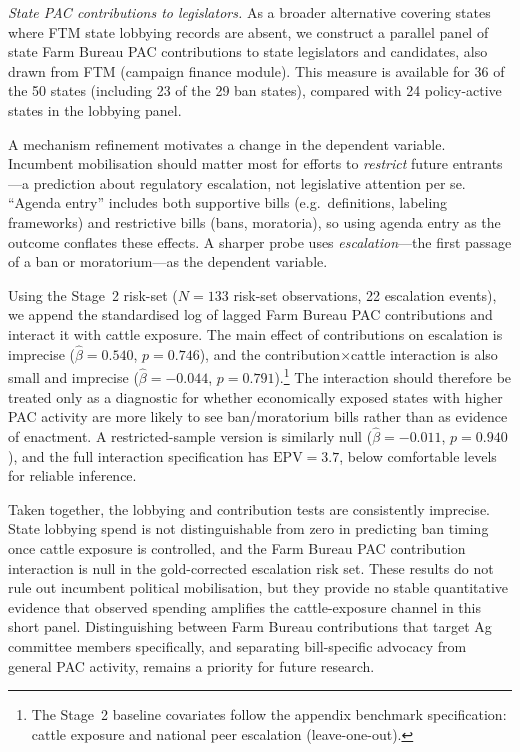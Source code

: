 \documentclass[12pt]{article}
\begin{document}
\textit{State PAC contributions to legislators.}  As a broader alternative covering states where FTM state lobbying records are absent, we construct a parallel panel of state Farm Bureau PAC contributions to state legislators and candidates, also drawn from FTM (campaign finance module).  This measure is available for 36 of the 50 states (including 23 of the 29 ban states), compared with 24 policy-active states in the lobbying panel.

A mechanism refinement motivates a change in the dependent variable.  Incumbent mobilisation should matter most for efforts to \emph{restrict} future entrants---a prediction about regulatory escalation, not legislative attention per se.  ``Agenda entry'' includes both supportive bills (e.g.\ definitions, labeling frameworks) and restrictive bills (bans, moratoria), so using agenda entry as the outcome conflates these effects.  A sharper probe uses \emph{escalation}---the first passage of a ban or moratorium---as the dependent variable.

Using the Stage~2 risk-set ($N = 133$ risk-set observations, 22 escalation events), we append the standardised log of lagged Farm Bureau PAC contributions and interact it with cattle exposure.  The main effect of contributions on escalation is imprecise ($\hat{\beta}=0.540$, $p=0.746$), and the contribution$\times$cattle interaction is also small and imprecise ($\hat{\beta}=-0.044$, $p=0.791$).\footnote{The Stage~2 baseline covariates follow the appendix benchmark specification: cattle exposure and national peer escalation (leave-one-out).}  The interaction should therefore be treated only as a diagnostic for whether economically exposed states with higher PAC activity are more likely to see ban/moratorium bills rather than as evidence of enactment.  A restricted-sample version is similarly null ($\hat{\beta}=-0.011$, $p=0.940$), and the full interaction specification has $\text{EPV}=3.7$, below comfortable levels for reliable inference.

Taken together, the lobbying and contribution tests are consistently imprecise.  State lobbying spend is not distinguishable from zero in predicting ban timing once cattle exposure is controlled, and the Farm Bureau PAC contribution interaction is null in the gold-corrected escalation risk set.  These results do not rule out incumbent political mobilisation, but they provide no stable quantitative evidence that observed spending amplifies the cattle-exposure channel in this short panel.  Distinguishing between Farm Bureau contributions that target Ag committee members specifically, and separating bill-specific advocacy from general PAC activity, remains a priority for future research.
\end{document}
